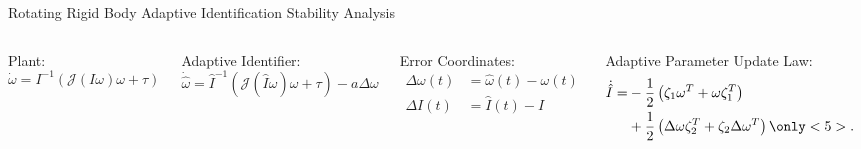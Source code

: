 \begin{frame}{Rotating Rigid Body Adaptive Identification Stability Analysis}

  \begin{columns}

    
    Plant:
    \begin{equation*}
      \dot{\omega} =I^{-1}\left(\mathcal{J}(I\omega)\omega+\tau\right) 
    \end{equation*}
    
    
    Adaptive Identifier:
    \begin{equation*}
      \dot{\hat{\omega}}=\hat{I}^{-1}\left(
        \mathcal{J}(\hat{I}\omega)\omega
        + \tau\right) - a \Delta \omega   
    \end{equation*}
 
   Error Coordinates:
    \begin{align}
      \Delta\omega(t)&=\hat{\omega}(t)-\omega(t)  \nonumber \\
      \Delta I(t)&=\hat{I}(t) - I                 \nonumber
    \end{align}
 
     
    Adaptive Parameter Update Law:
    \begin{align}
        \dot{\hat{I}}=&-\frac{1}{2}\left(\zeta_1 \omega^T +\omega
        \zeta_1^T\right)
      \nonumber \\
      &+\frac{1}{2}\left(\Delta\omega \zeta_2^T+\zeta_2
        \Delta\omega^T\right)\only<5>{.}
        \nonumber
    \end{align}
    


\end{columns}
\end{frame}
